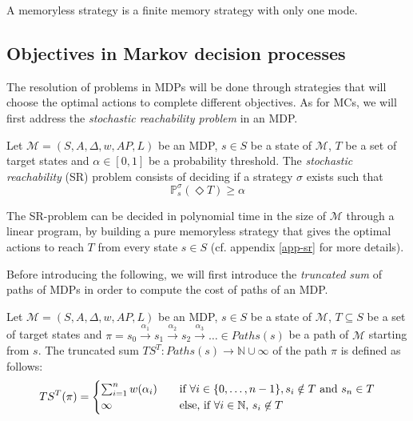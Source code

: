 \begin{property}
  A memoryless strategy is a finite memory strategy with only one mode.
\end{property}

\subsection{Objectives in Markov decision processes}
The resolution of problems in MDPs will be done through strategies that will choose the optimal actions to complete different objectives. As for MCs, we will first address the \textit{stochastic reachability problem} in an MDP.
\begin{definition}
  Let $\mathcal{M}=(S, A, \Delta, w, AP, L)$ be an MDP, $s \in S$ be a state of $\mathcal{M}$, $T$ be a set of target states and $\alpha \in [0, 1]$ be
  a probability threshold. The \textit{stochastic reachability} (SR) problem consists
  of deciding if a strategy $\sigma$ exists such that
  \[
    \mathbb{P}_s^\sigma(\Diamond T) \geq \alpha
  \]
\end{definition}

\begin{theorem}
  The SR-problem can be decided in polynomial time in the size of $\mathcal{M}$
  through a linear program, by building a pure memoryless strategy that gives the optimal actions to reach $T$ from every state $s \in S$ (cf. appendix \ref{app-sr} for more details).
\end{theorem}

Before introducing the following, we will first introduce the \textit{truncated sum} of paths of MDPs in order to compute the cost of paths of an MDP.

\begin{definition}
	Let $\mathcal{M} = (S, A, \Delta, w, AP, L)$ be an MDP, $s \in S$ be a state of $\mathcal{M}$, $T \subseteq S$ be a set of target states and
	$\pi = s_0 \xrightarrow{\alpha_1} s_1 \xrightarrow{\alpha_2} s_2 \xrightarrow{\alpha_3} \dots \in Paths(s)$ be a path of
	$\mathcal{M}$ starting from $s$. The truncated sum $TS^T: Paths(s)
	\rightarrow \mathbb{N} \cup {\infty}$ of the path $\pi$ is defined as follows:
	\[
		TS^T(\pi) =
		\begin{cases}
			\sum_{i = 1}^{n} w(\alpha_i) & \quad \text{if } \forall i \in \{0, \dots, n - 1\}, s_i \notin T \text{ and } s_n \in T \\
			\infty & \quad \text{else, if $ \forall i \in \mathbb{N}, \, s_i \not\in T$}
		\end{cases}
	\]

\end{definition}

